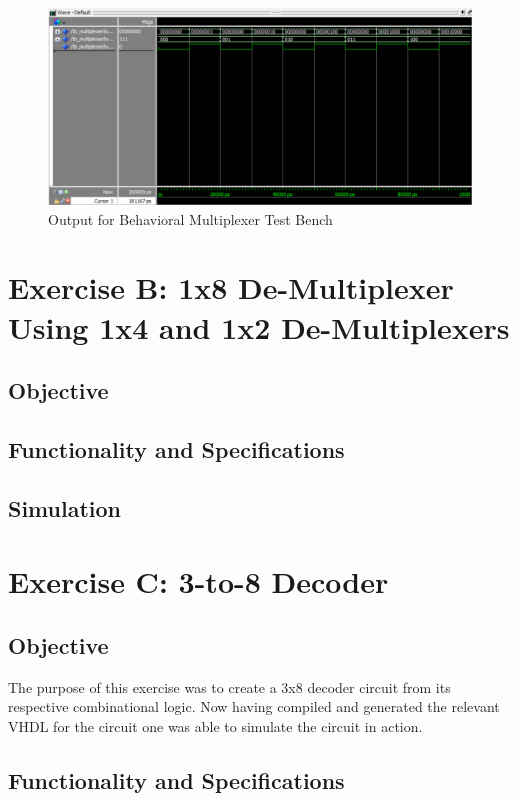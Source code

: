 \documentclass[12pt]{article}
\begin{document}
\begin{figure}[h]
\caption{Output for Behavioral Multiplexer Test Bench}
\centering
\includegraphics[width=\textwidth]{./diagrams/mux_behavioral.png}
\end{figure}
\clearpage


\section{Exercise B: 1x8 De-Multiplexer Using 1x4 and 1x2 De-Multiplexers}
\subsection{Objective}

\subsection{Functionality and Specifications}

\subsection{Simulation}
\clearpage
\section{Exercise C: 3-to-8 Decoder}
\subsection{Objective}
The purpose of this exercise was to create a 3x8 decoder circuit from its respective combinational logic. Now having compiled and generated the relevant VHDL for the circuit one was able to simulate the circuit in action.

\subsection{Functionality and Specifications}
\end{document}
